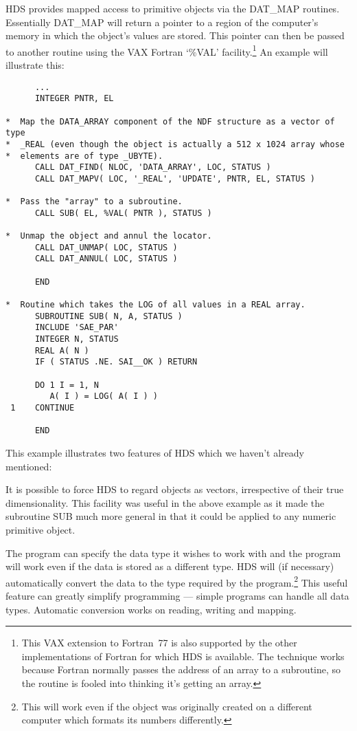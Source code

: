 HDS provides mapped access to primitive objects via the DAT\_MAP
routines. Essentially DAT\_MAP will return a pointer to a region of the
computer's memory in which the object's values are stored. This pointer can
then be passed to another routine using the VAX Fortran `\%VAL'
facility.\footnote{This VAX extension to Fortran~77 is also supported by the
other implementations of Fortran for which HDS is available. The technique
works because Fortran normally passes the address of an array to a subroutine,
so the routine is fooled into thinking it's getting an array.} An example will
illustrate this: 

\small
\begin{verbatim}
      ...
      INTEGER PNTR, EL

*  Map the DATA_ARRAY component of the NDF structure as a vector of type
*  _REAL (even though the object is actually a 512 x 1024 array whose
*  elements are of type _UBYTE).
      CALL DAT_FIND( NLOC, 'DATA_ARRAY', LOC, STATUS )
      CALL DAT_MAPV( LOC, '_REAL', 'UPDATE', PNTR, EL, STATUS )

*  Pass the "array" to a subroutine.
      CALL SUB( EL, %VAL( PNTR ), STATUS )

*  Unmap the object and annul the locator.
      CALL DAT_UNMAP( LOC, STATUS )
      CALL DAT_ANNUL( LOC, STATUS )

      END

*  Routine which takes the LOG of all values in a REAL array.
      SUBROUTINE SUB( N, A, STATUS )
      INCLUDE 'SAE_PAR'
      INTEGER N, STATUS
      REAL A( N )
      IF ( STATUS .NE. SAI__OK ) RETURN

      DO 1 I = 1, N
         A( I ) = LOG( A( I ) )
 1    CONTINUE

      END
\end{verbatim}
\normalsize

This example illustrates two features of HDS which we haven't already
mentioned:

\begin{description}
\label{sect:mapping}

\item [Vectorisation:]
It is possible to force HDS to regard objects as vectors, irrespective of
their true dimensionality. This facility was useful in the above example as
it made the subroutine SUB much more general in that it could be applied to
any numeric primitive object. 

\item [Automatic type conversion:]
The program can specify the data type it wishes to work with and the program
will work even if the data is stored as a different type. HDS will (if
necessary) automatically convert the data to the type required by the
program.\footnote{This will work even if the object was originally created on a
different computer which formats its numbers differently.} This useful feature
can greatly simplify programming --- simple programs can handle all data types.
Automatic conversion works on reading, writing and mapping. 

\end{description}

